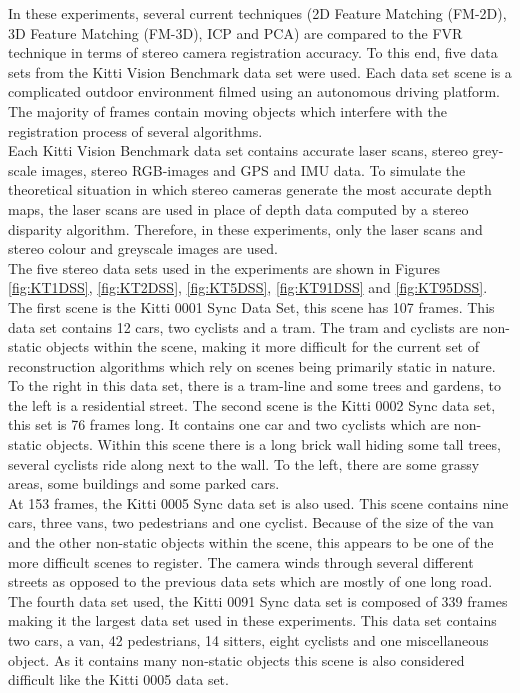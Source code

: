 	
In these experiments, several current techniques (2D Feature Matching (FM-2D), 3D Feature Matching (FM-3D), ICP and PCA) are compared to the FVR technique in terms of stereo camera registration accuracy. To this end, five data sets from the Kitti Vision Benchmark data set \cite{Geiger13Vision} were used. Each data set scene is a complicated outdoor environment filmed using an autonomous driving platform. The majority of frames contain moving objects which interfere with the registration process of several algorithms. \\

Each Kitti Vision Benchmark data set contains accurate laser scans, stereo grey-scale images, stereo RGB-images and GPS and IMU data. To simulate the theoretical situation in which stereo cameras generate the most accurate depth maps, the laser scans are used in place of depth data computed by a stereo disparity algorithm. Therefore, in these experiments, only the laser scans and stereo colour and greyscale images are used. \\

The five stereo data sets used in the experiments are shown in Figures \ref{fig:KT1DSS}, \ref{fig:KT2DSS}, \ref{fig:KT5DSS}, \ref{fig:KT91DSS} and \ref{fig:KT95DSS}. The first scene is the Kitti 0001 Sync Data Set, this scene has 107 frames. This data set contains 12 cars, two cyclists and a tram. The tram and cyclists are non-static objects within the scene, making it more difficult for the current set of reconstruction algorithms which rely on scenes being primarily static in nature. To the right in this data set, there is a tram-line and some trees and gardens, to the left is a residential street. The second scene is the Kitti 0002 Sync data set, this set is 76 frames long. It contains one car and two cyclists which are non-static objects. Within this scene there is a long brick wall hiding some tall trees, several cyclists ride along next to the wall. To the left, there are some grassy areas, some buildings and some parked cars. \\

At 153 frames, the Kitti 0005 Sync data set is also used. This scene contains nine cars, three vans, two pedestrians and one cyclist. Because of the size of the van and the other non-static objects within the scene, this appears to be one of the more difficult scenes to register. The camera winds through several different streets as opposed to the previous data sets which are mostly of one long road. The fourth data set used, the Kitti 0091 Sync data set is composed of 339 frames making it the largest data set used in these experiments. This data set contains two cars, a van, 42 pedestrians, 14 sitters, eight cyclists and one miscellaneous object. As it contains many non-static objects this scene is also considered difficult like the Kitti 0005 data set. \\

